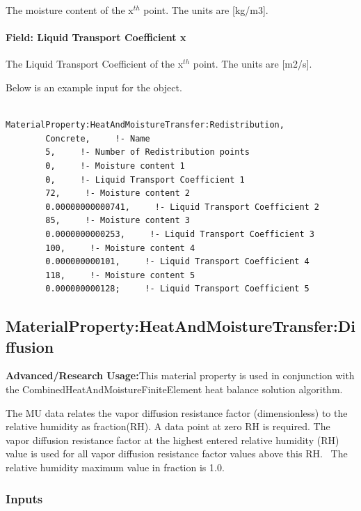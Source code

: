 The moisture content of the x\(^{th}\) point. The units are {[}kg/m3{]}.

\paragraph{Field: Liquid Transport Coefficient x}\label{field-liquid-transport-coefficient-x-1}

The Liquid Transport Coefficient of the x\(^{th}\) point. The units are {[}m2/s{]}.

Below is an example input for the object.

\begin{lstlisting}

MaterialProperty:HeatAndMoistureTransfer:Redistribution,
        Concrete,     !- Name
        5,     !- Number of Redistribution points
        0,     !- Moisture content 1
        0,     !- Liquid Transport Coefficient 1
        72,     !- Moisture content 2
        0.00000000000741,     !- Liquid Transport Coefficient 2
        85,     !- Moisture content 3
        0.0000000000253,     !- Liquid Transport Coefficient 3
        100,     !- Moisture content 4
        0.000000000101,     !- Liquid Transport Coefficient 4
        118,     !- Moisture content 5
        0.000000000128;     !- Liquid Transport Coefficient 5
\end{lstlisting}

\subsection{MaterialProperty:HeatAndMoistureTransfer:Diffusion}\label{materialpropertyheatandmoisturetransferdiffusion}

\textbf{Advanced/Research Usage:}This material property is used in conjunction with the CombinedHeatAndMoistureFiniteElement heat balance solution algorithm.

The MU data relates the vapor diffusion resistance factor (dimensionless) to the relative humidity as fraction(RH). A data point at zero RH is required. The vapor diffusion resistance factor at the highest entered relative humidity (RH) value is used for all vapor diffusion resistance factor values above this RH.~ The relative humidity maximum value in fraction is 1.0.

\subsubsection{Inputs}\label{inputs-11-019}

